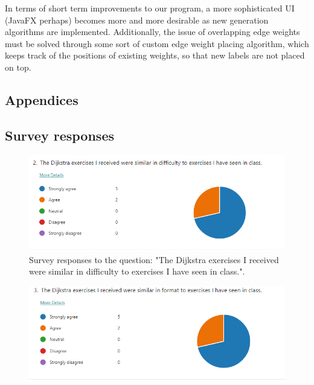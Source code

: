 \documentclass{l4proj}
\begin{document}
In terms of short term improvements to our program, a more sophisticated UI (JavaFX perhaps) becomes more and more desirable as new generation algorithms are implemented. Additionally, the issue of overlapping edge weights must be solved through some sort of custom edge weight placing algorithm, which keeps track of the positions of existing weights, so that new labels are not placed on top. 

%
% 

\begin{appendices}

\chapter{Appendices}
\label{chap:appendices}

\section{Survey responses}
\label{sec:survey_responses}
\begin{figure}[h]
    \centering
    \includegraphics[width=0.9\linewidth]{images/d_similar_difficulty.png}    

    \caption{Survey responses to the question: "The Dijkstra exercises I received were similar in difficulty to exercises I have seen in class.".}
    \label{fig:d_similar_difficulty} 
\end{figure}

\begin{figure}[h]
    \centering
    \includegraphics[width=0.9\linewidth]{images/d_similar_format.png}    


\end{figure}
\end{appendices}
\end{document}
